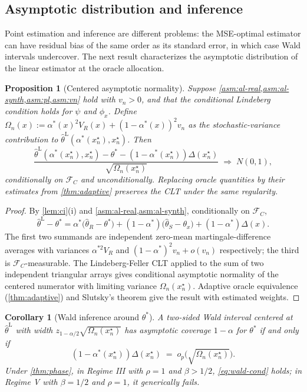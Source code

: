 \documentclass[11pt]{article}
\theoremstyle{plain}
\newtheorem{proposition}[theorem]{Proposition}
\newtheorem{corollary}[theorem]{Corollary}
\theoremstyle{definition}
\theoremstyle{remark}
\begin{document}
\subsection{Asymptotic distribution and inference}
\label{ssec:inference}

Point estimation and inference are different problems: the MSE-optimal estimator can have residual bias of the same order as its standard error, in which case Wald intervals undercover. The next result characterizes the asymptotic distribution of the linear estimator at the oracle allocation.

\begin{proposition}[Centered asymptotic normality]\label{prop:clt}
Suppose \cref{asm:al-real,asm:al-synth,asm:pl,asm:vn} hold with $v_n>0$, and that the conditional Lindeberg condition holds for $\psi$ and $\phi_x$. Define $\Omega_n(x):=\alpha^*(x)^2 V_R(x)+(1-\alpha^*(x))^2 v_n$ as the stochastic-variance contribution to $\hat\theta^{\mathrm{L}}(\alpha^*(x_n^\star),x_n^\star)$. Then
\begin{equation}\label{eq:clt}
\frac{\hat\theta^{\mathrm{L}}(\alpha^*(x_n^\star),x_n^\star)-\theta^*-(1-\alpha^*(x_n^\star))\Delta(x_n^\star)}{\sqrt{\Omega_n(x_n^\star)}}\;\Rightarrow\;N(0,1),
\end{equation}
conditionally on $\mathcal{F}_C$ and unconditionally. Replacing oracle quantities by their estimates from \cref{thm:adaptive} preserves the CLT under the same regularity.
\end{proposition}

\begin{proof}
By \cref{lem:ci}(i) and \cref{asm:al-real,asm:al-synth}, conditionally on $\mathcal{F}_C$,
\begin{equation*}
\hat\theta^{\mathrm{L}}-\theta^*=\alpha^*\bigl(\hat\theta_R-\theta^*\bigr)+(1-\alpha^*)\bigl(\hat\theta_S-\theta_x\bigr)+(1-\alpha^*)\Delta(x).
\end{equation*}
The first two summands are independent zero-mean martingale-difference averages with variances $\alpha^{*2}V_R$ and $(1-\alpha^*)^2 v_n+o(v_n)$ respectively; the third is $\mathcal{F}_C$-measurable. The Lindeberg-Feller CLT applied to the sum of two independent triangular arrays gives conditional asymptotic normality of the centered numerator with limiting variance $\Omega_n(x_n^\star)$. Adaptive oracle equivalence (\cref{thm:adaptive}) and Slutsky's theorem give the result with estimated weights.
\end{proof}

\begin{corollary}[Wald inference around $\theta^*$]\label{cor:wald}
A two-sided Wald interval centered at $\hat\theta^{\mathrm{L}}$ with width $z_{1-\alpha/2}\sqrt{\Omega_n(x_n^\star)}$ has asymptotic coverage $1-\alpha$ for $\theta^*$ if and only if
\begin{equation}\label{eq:wald-cond}
(1-\alpha^*(x_n^\star))\Delta(x_n^\star)\;=\;o_p\bigl(\sqrt{\Omega_n(x_n^\star)}\bigr).
\end{equation}
Under \cref{thm:phase}, in Regime III with $\rho=1$ and $\beta>1/2$, \cref{eq:wald-cond} holds; in Regime V with $\beta=1/2$ and $\rho=1$, it generically fails.
\end{corollary}
\end{document}
